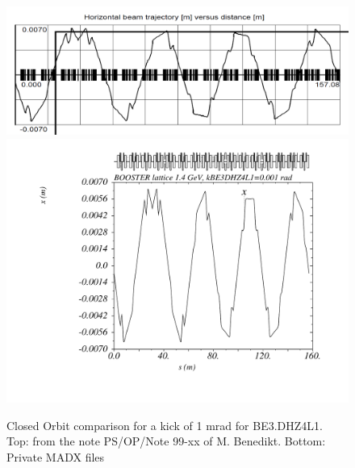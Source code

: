 \documentclass[11pt,letter,english]{article}
\begin{document}
\begin{figure}[!hbtp]
  \begin{center}
    \includegraphics[width=1.0\textwidth]{figs/LINC-BE_DHZ4L1.png}
    \includegraphics[width=1.0\textwidth]{figs/psb_orbit_BE3DHZ4L1at1mrad.pdf}
    \caption{Closed Orbit comparison for a kick of 1 mrad for BE3.DHZ4L1. Top: from the note PS/OP/Note 99-xx of M. Benedikt. Bottom: Private MADX files}
    \label{fig:BE_DHZ4L1}
  \end{center}
\end{figure}
\end{document}
